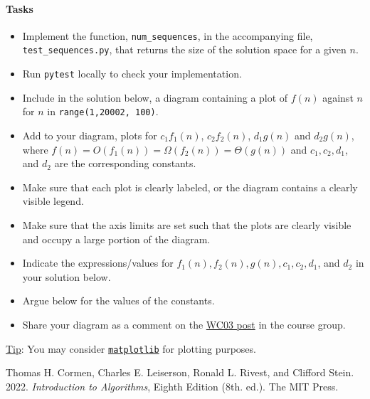 \documentclass[a4paper]{exam}
\begin{document}
\begin{questions}
  \paragraph{Tasks}
  \begin{itemize}
  \item Implement the function, \texttt{num\_sequences}, in the accompanying file, \texttt{test\_sequences.py}, that returns the size of the solution space for a given $n$.
  \item Run \texttt{pytest} locally to check your implementation.
  \item Include in the solution below, a diagram containing a plot of $f(n)$ against $n$ for $n$ in \texttt{range(1,20002, 100)}.
  \item Add to your diagram, plots for $c_1f_1(n)$, $c_2f_2(n)$, $d_1g(n)$ and $d_2g(n)$, where $f(n)=O(f_1(n))=\Omega(f_2(n))=\Theta(g(n))$ and $c_1,c_2,d_1$, and $d_2$ are the corresponding constants.
  \item Make sure that each plot is clearly labeled, or the diagram contains a clearly visible legend.
  \item Make sure that the axis limits are set such that the plots are clearly visible and occupy a large portion of the diagram.
  \item Indicate the expressions/values for  $f_1(n), f_2(n), g(n), c_1,c_2,d_1$, and $d_2$ in your solution below.
  \item Argue below for the values of the constants.
  \item Share your diagram as a comment on the \href{https://web.yammer.com/main/org/habib.edu.pk/threads/eyJfdHlwZSI6IlRocmVhZCIsImlkIjoiMjEwMjY3NTY0NDY3ODE0NCJ9}{WC03 post} in the course group.
  \end{itemize}
  \underline{Tip}: You may consider \href{https://matplotlib.org/stable/tutorials/introductory/pyplot.html}{\texttt{matplotlib}} for plotting purposes.

  
  \begin{thebibliography}{9}
    Thomas H. Cormen, Charles E. Leiserson, Ronald L. Rivest, and Clifford Stein. 2022. \textit{Introduction to Algorithms}, Eighth Edition (8th. ed.). The MIT Press.
  \end{thebibliography}

  \begin{solution}
    
  \end{solution}

\end{questions}
\end{document}
